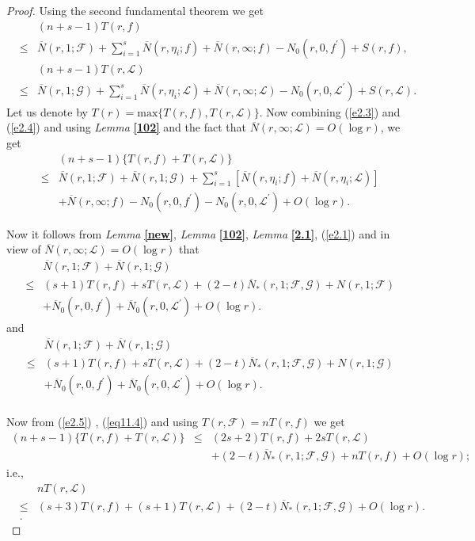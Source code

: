 \documentclass[a4paper,draft]{amsproc}
\theoremstyle{plain}
\theoremstyle{definition}
\theoremstyle{remark}
\newcommand{\ol}{\overline}
\newcommand{\be}{\begin{equation}}
\newcommand{\ee}{\end{equation}}
\newcommand{\bea}{\begin{eqnarray}}
\newcommand{\eea}{\end{eqnarray}}
\numberwithin{equation}{section}
\renewcommand{\leq}{\leqslant}\renewcommand{\geq}{\geqslant}
\begin{document}
\begin{proof}
Using the second fundamental theorem we get 
\bea\label{e2.3}&&(n+s-1)T(r,f)\\\nonumber&\leq&\ol N(r,1;\mathcal{F})+\sum\limits_{i=1}^{s}\ol N(r,\eta_{i};f)+\ol N(r,\infty;f)-N_{0}(r,0,f^{'})+S(r,f),\eea
\bea\label{e2.4}&&(n+s-1)T(r,\mathcal{L})\\\nonumber&\leq&\ol N(r,1;\mathcal{G})+\sum\limits_{i=1}^{s}\ol N(r,\eta_{i};\mathcal{L})+\ol N(r,\infty;\mathcal{L})-N_{0}(r,0,\mathcal{L}^{'})+S(r,\mathcal{L}).\eea
Let us denote by $T(r)=\text{max}\{T(r,f),T(r,\mathcal{L})\}$. Now combining (\ref{e2.3}) and (\ref{e2.4}) and using {\em Lemma} {\bf\ref{102}} and the fact that $\ol{N}(r,\infty;\mathcal{L})=O(\log r)$, we get
\bea
\label{e2.5}&&(n+s-1)\{T(r,f)+T(r,\mathcal{L})\}\\\nonumber&\leq&\ol N(r,1;\mathcal{F})+\ol N(r,1;\mathcal{G})+\sum\limits_{i=1}^{s}\left[\ol N(r,\eta_{i};f)+\ol N(r,\eta_{i};\mathcal{L})\right]\\\nonumber&&+\ol N(r,\infty;f)-N_{0}(r,0,f^{'})-N_{0}(r,0,\mathcal{L}^{'})+O(\log r).\nonumber
\eea


Now it follows from {\em Lemma} {\bf\ref{new}}, {\em Lemma} {\bf\ref{102}}, {\em Lemma} {\bf\ref{2.1}}, (\ref{e2.1}) and in view of $\ol{N}(r,\infty;\mathcal{L})=O(\log r)$ that 
\bea\label{eq11.4}&& \ol N(r,1;\mathcal{F})+\ol N(r,1;\mathcal{G})\\\nonumber&\leq&  (s+1)T(r,f)+sT(r,\mathcal{L})+(2-t)\ol N_{*}(r,1;\mathcal{F},\mathcal{G})+N(r,1;\mathcal{F})\\\nonumber&&+\ol N_{0}(r,0,f^{'})+\ol N_{0}(r,0,\mathcal{L}^{'})+O(\log r).\eea
and \bea\label{eq11.5}&&\ol N(r,1;\mathcal{F})+\ol N(r,1;\mathcal{G})\\\nonumber&\leq&  (s+1)T(r,f)+sT(r,\mathcal{L})+(2-t)\ol N_{*}(r,1;\mathcal{F},\mathcal{G})+N(r,1;\mathcal{G})\\\nonumber&&+\ol N_{0}(r,0,f^{'})+\ol N_{0}(r,0,\mathcal{L}^{'})+O(\log r).\eea\\

Now from (\ref{e2.5}) , (\ref{eq11.4}) and using $T(r,\mathcal{F})=nT(r,f)$ we get
\bea(n+s-1)\{T(r,f)+T(r,\mathcal{L})\}\nonumber&\leq&(2s+2)T(r,f)+2sT(r,\mathcal{L})\\\nonumber&&+(2-t)\ol N_{*}(r,1;\mathcal{F},\mathcal{G})+nT(r,f)+O(\log r);\eea
i.e.,
\bea\label{eq11.6}&& nT(r,\mathcal{L})\\\nonumber
&\leq& (s+3)T(r,f)+(s+1)T(r,\mathcal{L})+(2-t)\ol N_{*}(r,1;\mathcal{F},\mathcal{G})+O(\log r).\\\nonumber&
.\nonumber\eea


\end{proof}
\end{document}
